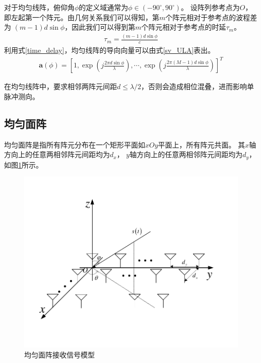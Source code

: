 \documentclass[master]{thesis-uestc}
\begin{document}
对于均匀线阵，俯仰角$\phi$的定义域通常为$\phi\in\left(-90^\circ,90^\circ\right)$。
设阵列参考点为$O$，即左起第一个阵元。由几何关系我们可以得知，第$m$个阵元相对于参考点的波程差为
$(m-1)d\sin\phi$，因此我们可以得到第$m$个阵元相对于参考点的时延$\tau_m$。
\begin{equation}\label{time_delay}
    \begin{aligned}
    \tau_m = \frac{(m-1)d\sin\phi}{c}
    \end{aligned}
\end{equation}
利用式\eqref{time_delay}，均匀线阵的导向向量可以由式\eqref{sv_ULA}表出。
\begin{equation}\label{sv_ULA}
    \begin{aligned}
        \bm{a}(\phi) = 
        \left[
        1,
        \exp\left(j\frac{2\pi d\sin\phi}{\lambda}\right),
        \cdots,
        \exp\left(j\frac{2\pi(M-1)d\sin\phi}{\lambda}\right)
        \right]^T
    \end{aligned}
\end{equation}

在均匀线阵中，要求相邻两阵元间距$d\leq\lambda/2$，否则会造成相位混叠，进而影响单脉冲测向。

\subsection{均匀面阵}
均匀面阵是指所有阵元分布在一个矩形平面如$xOy$平面上，所有阵元共面。
其$x$轴方向上的任意两相邻阵元间距均为$d_x$，
$y$轴方向上的任意两相邻阵元间距均为$d_y$，如图\ref{URA}所示。
\begin{figure}[h]
\includegraphics[scale=0.8]{pic/URA.pdf}
\caption{均匀面阵接收信号模型}
\label{URA}
\end{figure}
\end{document}
